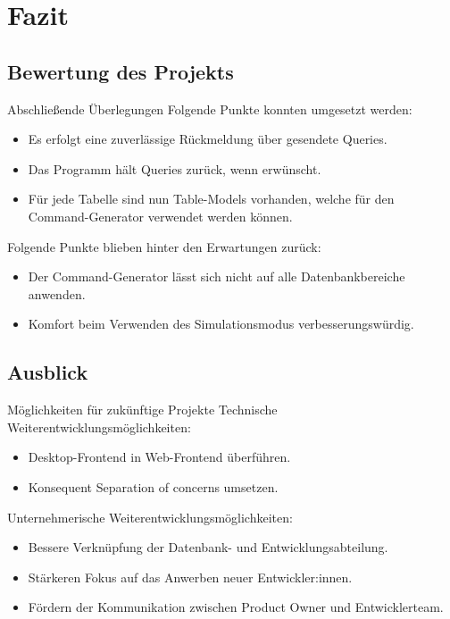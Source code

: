 \documentclass[toc]{beamer}
\begin{document}
\section{Fazit}
    \subsection{Bewertung des Projekts}
        \begin{frame}{Abschließende Überlegungen}
            Folgende Punkte konnten umgesetzt werden:
                \begin{itemize}
                    \item Es erfolgt eine zuverlässige Rückmeldung über gesendete Queries.
                    \item Das Programm hält Queries zurück, wenn erwünscht.
                    \item Für jede Tabelle sind nun Table-Models vorhanden, welche für den Command-Generator verwendet werden können.
                \end{itemize}
            Folgende Punkte blieben hinter den Erwartungen zurück:
                \begin{itemize}
                    \item Der Command-Generator lässt sich nicht auf alle Datenbankbereiche anwenden.
                    \item Komfort beim Verwenden des Simulationsmodus verbesserungswürdig.
                \end{itemize}
            
    \end{frame}
    
    \subsection{Ausblick}
        \begin{frame}{Möglichkeiten für zukünftige Projekte}
            Technische Weiterentwicklungsmöglichkeiten:
                 \begin{itemize}
                     \item Desktop-Frontend in Web-Frontend überführen.
                     \item Konsequent \glqq Separation of concerns\grqq{} umsetzen.
                 \end{itemize}
            Unternehmerische Weiterentwicklungsmöglichkeiten:
                 \begin{itemize}
                     \item Bessere Verknüpfung der Datenbank- und Entwicklungsabteilung.
                     \item Stärkeren Fokus auf das Anwerben neuer Entwickler:innen.
                     \item Fördern der Kommunikation zwischen Product Owner und Entwicklerteam.
                 \end{itemize}
        \end{frame}
\end{document}
